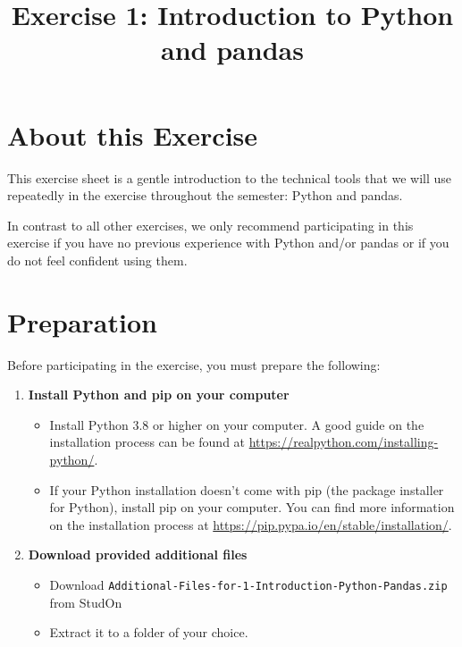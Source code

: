 \documentclass[
english,
smallborders
]{../i6prcsht}
\begin{document}
\title{Exercise 1: Introduction to Python and pandas}
\maketitle

\section*{About this Exercise}

This exercise sheet is a gentle introduction to the technical tools that we will use repeatedly in the exercise throughout the semester: Python and pandas.

In contrast to all other exercises, we only recommend participating in this exercise if you have no previous experience with Python and/or pandas or if you do not feel confident using them.

\section*{Preparation}

Before participating in the exercise, you must prepare the following:

\begin{enumerate}
	\item \textbf{Install Python and pip on your computer}

	      \begin{itemize}
		      \item Install Python 3.8 or higher on your computer.
		            A good guide on the installation process can be found at \url{https://realpython.com/installing-python/}.
		      \item If your Python installation doesn't come with pip (the package installer for Python), install pip on your computer.
		            You can find more information on the installation process at \url{https://pip.pypa.io/en/stable/installation/}.
	      \end{itemize}

	\item \textbf{Download provided additional files}

	      \begin{itemize}
		      \item Download \texttt{Additional-Files-for-1-Introduction-Python-Pandas.zip} from StudOn
		      \item Extract it to a folder of your choice.
	      \end{itemize}

\end{enumerate}
\end{document}
